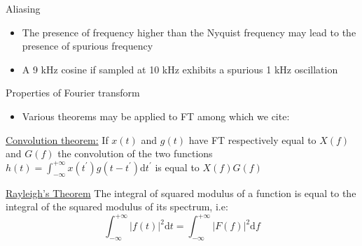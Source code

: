 \documentclass[t,10pt]{beamer}
\begin{document}
\begin{frame}{Aliasing}

\begin{itemize}
\item The presence of frequency higher than the Nyquist frequency may
  lead to the presence of spurious frequency
\end{itemize}
\begin{itemize}
\item A 9 kHz cosine if sampled at 10 kHz exhibits a spurious 1 kHz oscillation
\end{itemize}
\end{frame}


\begin{frame}{Properties of Fourier transform}

\begin{itemize}
\item Various theorems may be applied to
  FT \parencite{Bracewell:1999ua} among which we cite:
\end{itemize}
\begin{theorem}{\underline{Convolution theorem:}}
If $x(t)$ and $g(t)$ have FT respectively equal to $X(f)$ and $G(f)$
the convolution of the two functions $h(t) = \int_{-\infty}^{+\infty}x(t^{'})g(t-t^{'})\mathrm{d}t^{'}$
is equal to $X(f)G(f)$
\end{theorem}
\begin{theorem}{\underline{Rayleigh's Theorem}}
The integral of squared modulus of a function is equal to the
integral of the squared modulus of its spectrum, i.e:
\begin{equation*}
\int_{-\infty}^{+\infty}|f(t)|^2\mathrm{d}t =
\int_{-\infty}^{+\infty}|F(f)|^2\mathrm{d}f
\end{equation*}
\end{theorem}
\end{frame}
\end{document}
